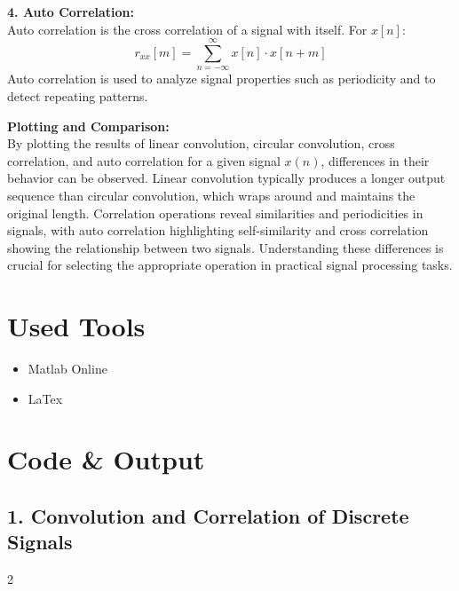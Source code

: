 \documentclass[11pt]{article}
\begin{document}
\textbf{4. Auto Correlation:} \\
Auto correlation is the cross correlation of a signal with itself. For $x[n]$:
\begin{equation}
    r_{xx}[m] = \sum_{n=-\infty}^{\infty} x[n] \cdot x[n+m]
\end{equation}
Auto correlation is used to analyze signal properties such as periodicity and to detect repeating patterns.

\vspace{0.5em}
\textbf{Plotting and Comparison:} \\
By plotting the results of linear convolution, circular convolution, cross correlation, and auto correlation for a given signal $x(n)$, differences in their behavior can be observed. Linear convolution typically produces a longer output sequence than circular convolution, which wraps around and maintains the original length. Correlation operations reveal similarities and periodicities in signals, with auto correlation highlighting self-similarity and cross correlation showing the relationship between two signals. Understanding these differences is crucial for selecting the appropriate operation in practical signal processing tasks.

\section*{Used Tools}
\begin{itemize}
    \item Matlab Online
    \item LaTex
\end{itemize}

\section*{Code \& Output}

\subsection*{1. Convolution and Correlation of Discrete Signals}
\begin{multicols}{2}
    \inputminted[fontsize=\small, linenos, breaklines]{matlab}{assets/task1.m}
\end{multicols}
\end{document}

